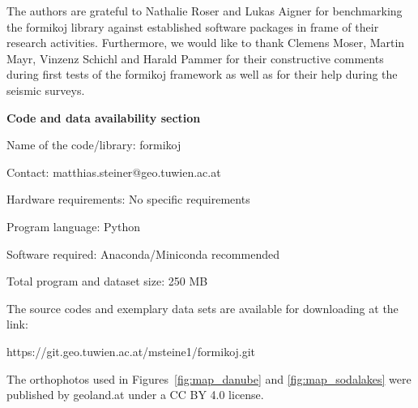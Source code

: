 \documentclass[a4paper,fleqn]{cas-sc}
\begin{document}
The authors are grateful to Nathalie Roser and Lukas Aigner for benchmarking the formikoj library against established software packages in frame of their research activities. Furthermore, we would like to thank Clemens Moser, Martin Mayr, Vinzenz Schichl and Harald Pammer for their constructive comments during first tests of the formikoj framework as well as for their help during the seismic surveys.

\newpage

\textbf{Code and data availability section}

Name of the code/library: formikoj

Contact: matthias.steiner@geo.tuwien.ac.at

Hardware requirements: No specific requirements

Program language: Python
 
Software required: Anaconda/Miniconda recommended

Total program and dataset size: 250 MB

The source codes and exemplary data sets are available for downloading at the link:

https://git.geo.tuwien.ac.at/msteine1/formikoj.git

The orthophotos used in Figures~\ref{fig:map_danube} and \ref{fig:map_sodalakes} were published by geoland.at under a CC BY 4.0 license.


 
\end{document}
